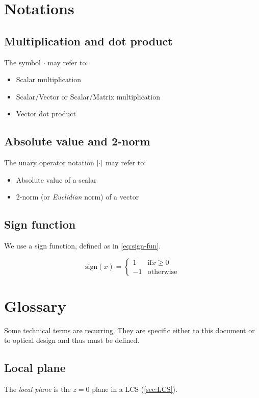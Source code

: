 \section{Notations}
\subsection{Multiplication and dot product}
The symbol $\cdot$ may refer to:
\begin{itemize}
\item Scalar multiplication
\item Scalar/Vector or Scalar/Matrix multiplication
\item Vector dot product
\end{itemize}

\subsection{Absolute value and 2-norm}
The unary operator notation $\abs{\cdot}$ may refer to:
\begin{itemize}
\item Absolute value of a scalar
\item 2-norm (or \emph{Euclidian} norm) of a vector
\end{itemize}

\subsection{Sign function}
We use a sign function, defined as in \cref{eq:sign-fun}.

\begin{equation} \label{eq:sign-fun}
\textrm{sign}(x) = \begin{cases}
1 & \text{if} x \geq 0 \\
-1 & \text{otherwise}
\end{cases} \end{equation}

\section{Glossary}
Some technical terms are recurring. They are specific either to this document
or to optical design and thus must be defined.

\subsection{Local plane}
The \emph{local plane} is the $z=0$ plane in a \gls{LCS} (\cref{sec:LCS}).

